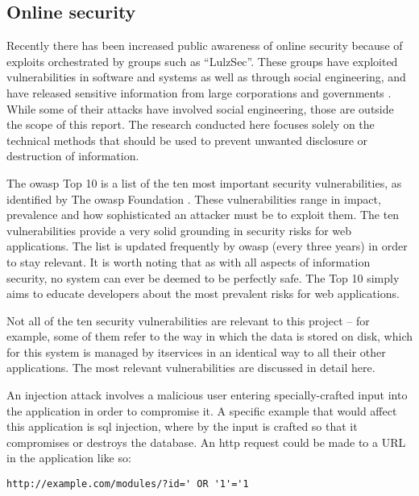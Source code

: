 
\subsection{Online security}
\label{sec:research_security}

Recently there has been increased public awareness of online security because
of exploits orchestrated by groups such as ``LulzSec''. These groups have
exploited vulnerabilities in software and systems as well as through social
engineering, and have released sensitive information from large corporations
and governments \cite{ASATrendsinDataBreaches_2012}. While some of their
attacks have involved social engineering, those are outside the scope of this
report. The research conducted here focuses solely on the technical methods
that should be used to prevent unwanted disclosure or destruction of
information.

The \gls{owasp} Top 10 is a list of the ten most important security
vulnerabilities, as identified by The \gls{owasp} Foundation
\cite{OWASPTop10_2010}. These vulnerabilities range in impact, prevalence and
how sophisticated an attacker must be to exploit them. The ten vulnerabilities
provide a very solid grounding in security risks for web applications. The
list is updated frequently by \gls{owasp} (every three years) in order to stay
relevant. It is worth noting that as with all aspects of information security,
no system can ever be deemed to be perfectly safe. The Top 10 simply aims to
educate developers about the most prevalent risks for web applications.

Not all of the ten security vulnerabilities are relevant to this project --
for example, some of them refer to the way in which the data is stored on
disk, which for this system is managed by \gls{itservices} in an identical way
to all their other applications. The most relevant vulnerabilities are
discussed in detail here.

\mynobreakpar

An injection attack involves a malicious user entering specially-crafted input
into the application in order to compromise it. A specific example that would
affect this application is \gls{sql} injection, where by the input is crafted
so that it compromises or destroys the database. An \gls{http} request could
be made to a URL in the application like so:

\begin{lstlisting}
http://example.com/modules/?id=' OR '1'='1
\end{lstlisting}

